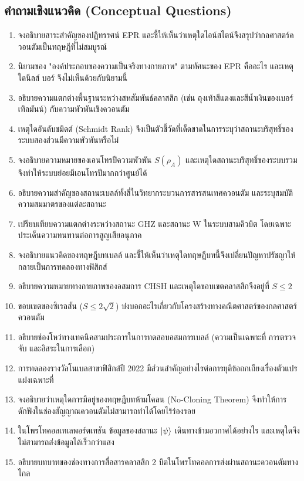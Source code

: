 \subsection*{คำถามเชิงแนวคิด (Conceptual Questions)}

\begin{enumerate}[label=\textbf{\arabic*.}]
    \item จงอธิบายสาระสำคัญของปฏิทรรศน์ EPR และชี้ให้เห็นว่าเหตุใดไอน์สไตน์จึงสรุปว่ากลศาสตร์ควอนตัมเป็นทฤษฎีที่ไม่สมบูรณ์
    \item นิยามของ "องค์ประกอบของความเป็นจริงทางกายภาพ" ตามทัศนะของ EPR คืออะไร และเหตุใดนีลส์ บอร์ จึงไม่เห็นด้วยกับนิยามนี้
    \item อธิบายความแตกต่างพื้นฐานระหว่างสหสัมพันธ์คลาสสิก (เช่น ถุงเท้าสีแดงและสีน้ำเงินของเบอร์เทิลมันน์) กับความพัวพันเชิงควอนตัม
    \item เหตุใดอันดับชมิดต์ (Schmidt Rank) จึงเป็นตัวชี้วัดที่เด็ดขาดในการระบุว่าสถานะบริสุทธิ์ของระบบสองส่วนมีความพัวพันหรือไม่
    \item จงอธิบายความหมายของเอนโทรปีความพัวพัน $S(\rho_A)$ และเหตุใดสถานะบริสุทธิ์ของระบบรวมจึงทำให้ระบบย่อยมีเอนโทรปีมากกว่าศูนย์ได้
    \item อธิบายความสำคัญของสถานะเบลล์ทั้งสี่ในวิทยากระบวนการสารสนเทศควอนตัม และระบุสมบัติความสมมาตรของแต่ละสถานะ
    \item เปรียบเทียบความแตกต่างระหว่างสถานะ GHZ และสถานะ W ในระบบสามคิวบิต โดยเฉพาะประเด็นความทนทานต่อการสูญเสียอนุภาค
    \item จงอธิบายแนวคิดของทฤษฎีบทเบลล์ และชี้ให้เห็นว่าเหตุใดทฤษฎีบทนี้จึงเปลี่ยนปัญหาปรัชญาให้กลายเป็นการทดลองทางฟิสิกส์
    \item อธิบายความหมายทางกายภาพของอสมการ CHSH และเหตุใดขอบเขตคลาสสิกจึงอยู่ที่ $S \le 2$
    \item ขอบเขตของซิเรลสัน ($S \le 2\sqrt{2}$) บ่งบอกอะไรเกี่ยวกับโครงสร้างทางคณิตศาสตร์ของกลศาสตร์ควอนตัม
    \item อธิบายช่องโหว่ทางเทคนิคสามประการในการทดสอบอสมการเบลล์ (ความเป็นเฉพาะที่ การตรวจจับ และอิสระในการเลือก)
    \item การทดลองรางวัลโนเบลสาขาฟิสิกส์ปี 2022 มีส่วนสำคัญอย่างไรต่อการยุติข้อถกเถียงเรื่องตัวแปรแฝงเฉพาะที่
    \item จงอธิบายว่าเหตุใดการมีอยู่ของทฤษฎีบทห้ามโคลน (No-Cloning Theorem) จึงทำให้การดักฟังในช่องสัญญาณควอนตัมไม่สามารถทำได้โดยไร้ร่องรอย
    \item ในโพรโทคอลเทเลพอร์ตเทชัน ข้อมูลของสถานะ $\ket{\psi}$ เดินทางข้ามอวกาศได้อย่างไร และเหตุใดจึงไม่สามารถส่งข้อมูลได้เร็วกว่าแสง
    \item อธิบายบทบาทของช่องทางการสื่อสารคลาสสิก 2 บิตในโพรโทคอลการส่งผ่านสถานะควอนตัมทางไกล

\end{enumerate}
